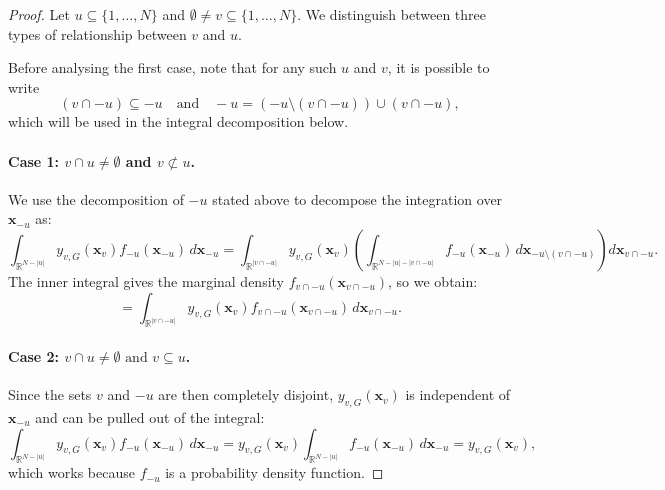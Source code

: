 \begin{proof}
Let $u \subseteq \{1,\dots,N\}$ and $\emptyset \ne v \subseteq \{1,\dots,N\}$. We distinguish between three types of relationship between $v$ and $u$.

Before analysing the first case, note that for any such $u$ and $v$, it is possible to write
\[
(v \cap -u) \subseteq -u \quad \text{and} \quad -u = (-u \setminus (v \cap -u)) \cup (v \cap -u),
\]
which will be used in the integral decomposition below.

\paragraph{Case 1: \( v \cap u \ne \emptyset \) and \( v \not\subset u \).}
We use the decomposition of $-u$ stated above to decompose the integration over $\mathbf{x}_{-u}$ as:
\[
\int_{\mathbb{R}^{N - |u|}} y_{v,G}(\mathbf{x}_v) f_{-u}(\mathbf{x}_{-u}) \, d\mathbf{x}_{-u}
= \int_{\mathbb{R}^{|v \cap -u|}} y_{v,G}(\mathbf{x}_v)
\left( \int_{\mathbb{R}^{N - |u| - |v \cap -u|}} f_{-u}(\mathbf{x}_{-u}) \, d\mathbf{x}_{-u \setminus (v \cap -u)} \right)
d\mathbf{x}_{v \cap -u}.
\]
The inner integral gives the marginal density $f_{v \cap -u}(\mathbf{x}_{v \cap -u})$, so we obtain:
\[
= \int_{\mathbb{R}^{|v \cap -u|}} y_{v,G}(\mathbf{x}_v) f_{v \cap -u}(\mathbf{x}_{v \cap -u}) \, d\mathbf{x}_{v \cap -u}.
\]

\paragraph{Case 2: $v \cap u \ne \emptyset \text{ and } v \subseteq u$.}
Since the sets $v$ and $-u$ are then completely disjoint, $y_{v,G}(\mathbf{x}_v)$ is independent of $\mathbf{x}_{-u}$ and can be pulled out of the integral:
\[
\int_{\mathbb{R}^{N - |u|}} y_{v,G}(\mathbf{x}_v) f_{-u}(\mathbf{x}_{-u}) \, d\mathbf{x}_{-u}
= y_{v,G}(\mathbf{x}_v) \int_{\mathbb{R}^{N - |u|}} f_{-u}(\mathbf{x}_{-u}) \, d\mathbf{x}_{-u}
= y_{v,G}(\mathbf{x}_v),
\]
which works because $f_{-u}$ is a probability density function.


\end{proof}
